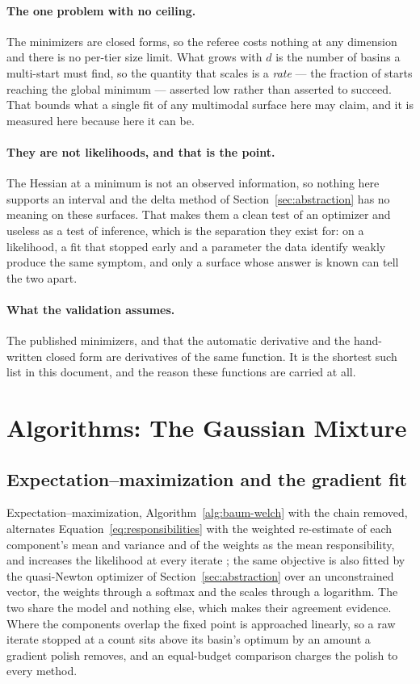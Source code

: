 \documentclass[11pt,a4paper]{article}
\begin{document}
\paragraph{The one problem with no ceiling.}
The minimizers are closed forms, so the referee costs nothing at any dimension
and there is no per-tier size limit. What grows with $d$ is the number of
basins a multi-start must find, so the quantity that scales is a \emph{rate}
--- the fraction of starts reaching the global minimum --- asserted low rather
than asserted to succeed. That bounds what a single fit of any multimodal
surface here may claim, and it is measured here because here it can be.

\paragraph{They are not likelihoods, and that is the point.}
The Hessian at a minimum is not an observed information, so nothing here
supports an interval and the delta method of
Section~\ref{sec:abstraction} has no meaning on these surfaces. That makes
them a clean test of an optimizer and useless as a test of inference, which
is the separation they exist for: on a likelihood, a fit that stopped early
and a parameter the data identify weakly produce the same symptom, and only
a surface whose answer is known can tell the two apart.

\paragraph{What the validation assumes.}
The published minimizers, and that the automatic derivative and the
hand-written closed form are derivatives of the same function. It is the
shortest such list in this document, and the reason these functions are
carried at all.

\section{Algorithms: The Gaussian Mixture}
\label{sec:mixture:algorithms}

\subsection{Expectation--maximization and the gradient fit}
Expectation--maximization, Algorithm~\ref{alg:baum-welch} with the chain
removed, alternates Equation~\ref{eq:responsibilities}
with the weighted re-estimate of each component's mean and variance and of
the weights as the mean responsibility, and increases the likelihood at every
iterate \citep{mackay2003}; the same objective is also fitted by the
quasi-Newton optimizer of Section~\ref{sec:abstraction} over an unconstrained
vector, the weights through a softmax and the scales through a logarithm.
The two share the model and nothing else, which makes their agreement evidence.
Where the components overlap the fixed point is approached linearly, so a raw
iterate stopped at a count sits above its basin's optimum by an amount a
gradient polish removes, and an equal-budget comparison charges the polish to
every method.
\end{document}
